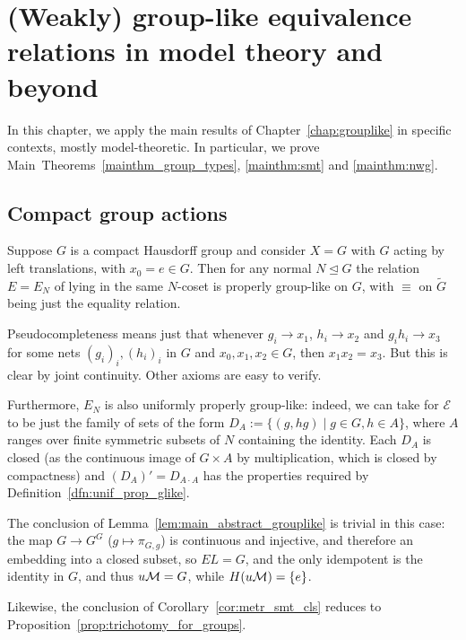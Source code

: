 
	\chapter{(Weakly) group-like equivalence relations in model theory and beyond}
	\label{chap:applications}
	In this chapter, we apply the main results of Chapter~\ref{chap:grouplike} in specific contexts, mostly model-theoretic. In particular, we prove Main~Theorems~\ref{mainthm_group_types}, \ref{mainthm:smt} and \ref{mainthm:nwg}.
	\section{Compact group actions}
	\begin{ex}
		\label{ex:cpct_glike}
		\begin{figure}[H]
		\end{figure}
		Suppose $G$ is a compact Hausdorff group and consider $X=G$ with $G$ acting by left translations, with $x_0=e\in G$. Then for any normal $N\unlhd G$ the relation $E=E_N$ of lying in the same $N$-coset is properly group-like on $G$, with ${\equiv}$ on $\tilde G$ being just the equality relation.
		
		Pseudocompleteness means just that whenever $g_i\to x_1$, $h_i\to x_2$ and $g_ih_i\to x_3$ for some nets $(g_i)_i,(h_i)_i$ in $G$ and $x_0,x_1,x_2\in G$, then $x_1x_2=x_3$. But this is clear by joint continuity. Other axioms are easy to verify.
		
		Furthermore, $E_N$ is also uniformly properly group-like: indeed, we can take for $\mathcal E$ to be just the family of sets of the form $D_A:=\{(g,hg)\mid g\in G, h\in A \}$, where $A$ ranges over finite symmetric subsets of $N$ containing the identity. Each $D_A$ is closed (as the continuous image of $G\times A$ by multiplication, which is closed by compactness) and $(D_A)'=D_{A\cdot A}$ has the properties required by Definition~\ref{dfn:unif_prop_glike}.
		
		The conclusion of Lemma~\ref{lem:main_abstract_grouplike} is trivial in this case: the map $G\to G^G$ ($g\mapsto \pi_{G,g}$) is continuous and injective, and therefore an embedding into a closed subset, so $EL=G$, and the only idempotent is the identity in $G$, and thus $u{\mathcal M}=G$, while $H(u{\mathcal M})=\{e\}$.
		
		Likewise, the conclusion of Corollary~\ref{cor:metr_smt_cls} reduces to Proposition~\ref{prop:trichotomy_for_groups}.
		\xqed{\lozenge}
	\end{ex}
	
